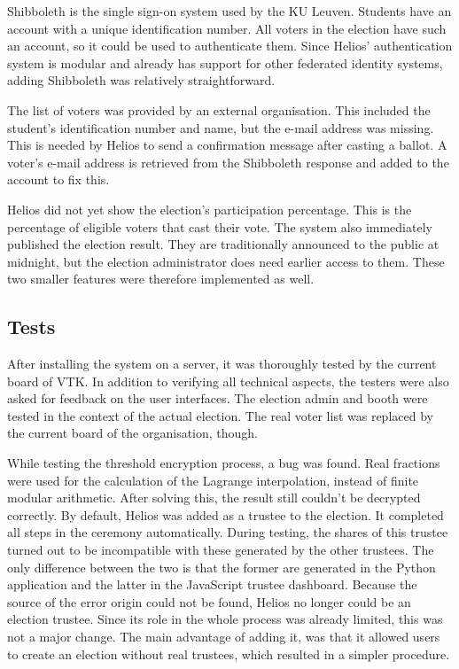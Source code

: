 Shibboleth is the single sign-on system used by the KU Leuven. Students have an account with a unique identification number. All voters in the election have such an account, so it could be used to authenticate them. Since Helios' authentication system is modular and already has support for other federated identity systems, adding Shibboleth was relatively straightforward.

\par The list of voters was provided by an external organisation. This included the student's identification number and name, but the e-mail address was missing. This is needed by Helios to send a confirmation message after casting a ballot. A voter's e-mail address is retrieved from the Shibboleth response and added to the account to fix this.

\par Helios did not yet show the election's participation percentage. This is the percentage of eligible voters that cast their vote. The system also immediately published the election result. They are traditionally announced to the public at midnight, but the election administrator does need earlier access to them. These two smaller features were therefore implemented as well.

\subsection{Tests}
\label{sec:be:tests}

After installing the system on a server, it was thoroughly tested by the current board of VTK. In addition to verifying all technical aspects, the testers were also asked for feedback on the user interfaces. The election admin and booth were tested in the context of the actual election. The real voter list was replaced by the current board of the organisation, though.

\par While testing the threshold encryption process, a bug was found. Real fractions were used for the calculation of the Lagrange interpolation, instead of finite modular arithmetic. After solving this, the result still couldn't be decrypted correctly. By default, Helios was added as a trustee to the election. It completed all steps in the ceremony automatically. During testing, the shares of this trustee turned out to be incompatible with these generated by the other trustees. The only difference between the two is that the former are generated in the Python application and the latter in the JavaScript trustee dashboard. Because the source of the error origin could not be found, Helios no longer could be an election trustee. Since its role in the whole process was already limited, this was not a major change. The main advantage of adding it, was that it allowed users to create an election without real trustees, which resulted in a simpler procedure.

